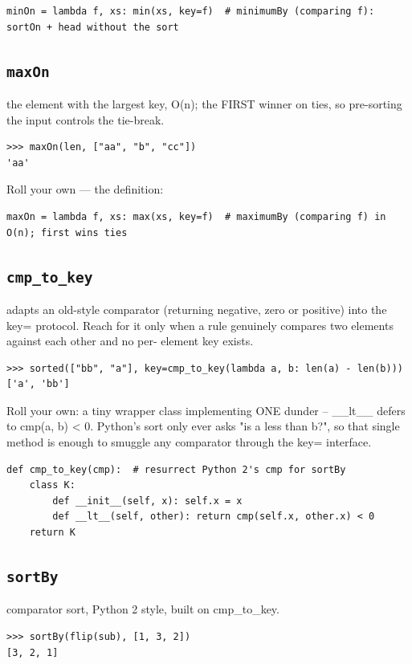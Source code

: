 \documentclass[10pt,letterpaper]{book}
\begin{document}
\begin{lstlisting}[style=ex]
minOn = lambda f, xs: min(xs, key=f)  # minimumBy (comparing f): sortOn + head without the sort
\end{lstlisting}
\subsection{\texttt{maxOn}}\label{def:maxOn}
the element with the largest key, O(n); the FIRST winner on ties, so pre-sorting the input controls the tie-break.
\begin{lstlisting}[style=ex]
>>> maxOn(len, ["aa", "b", "cc"])
'aa'
\end{lstlisting}

Roll your own --- the definition:

\begin{lstlisting}[style=ex]
maxOn = lambda f, xs: max(xs, key=f)  # maximumBy (comparing f) in O(n); first wins ties
\end{lstlisting}
\subsection{\texttt{cmp\_to\_key}}\label{def:cmp-to-key}
adapts an old-style comparator (returning negative, zero or positive) into the key= protocol. Reach for it only when a rule genuinely compares two elements against each other and no per- element key exists.
\begin{lstlisting}[style=ex]
>>> sorted(["bb", "a"], key=cmp_to_key(lambda a, b: len(a) - len(b)))
['a', 'bb']
\end{lstlisting}

Roll your own: a tiny wrapper class implementing ONE dunder -- \_\_lt\_\_ defers to cmp(a, b) < 0. Python's sort only ever asks "is a less than b?", so that single method is enough to smuggle any comparator through the key= interface.

\begin{lstlisting}[style=ex]
def cmp_to_key(cmp):  # resurrect Python 2's cmp for sortBy
    class K:
        def __init__(self, x): self.x = x
        def __lt__(self, other): return cmp(self.x, other.x) < 0
    return K
\end{lstlisting}

\subsection{\texttt{sortBy}}\label{def:sortBy}
comparator sort, Python 2 style, built on cmp\_to\_key.
\begin{lstlisting}[style=ex]
>>> sortBy(flip(sub), [1, 3, 2])
[3, 2, 1]
\end{lstlisting}
\end{document}
